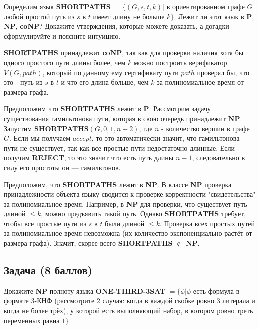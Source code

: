 Определим язык \textbf{SHORTPATHS} $= \{(G, s, t, k) |$ в ориентированном графе $G$ любой простой путь из $s$ в $t$ имеет длину не больше $k\}$. Лежит ли этот язык в \textbf{P}, \textbf{NP}, \textbf{coNP}? Докажите утверждения, которые можете доказать, а догадки - сформулируйте и поясните интуицию.

\begin{solution}
    \textbf{SHORTPATHS} принадлежит \textbf{coNP}, так как для проверки наличия хотя бы одного простого пути длины более, чем $k$ можно построить верификатор $V(G, path)$, который по данному ему сертификату пути $path$ проверял бы, что это - путь из $s$ в $t$ и что его длина больше, чем $k$ за полиномиальное время от размера графа.

    Предположим что \textbf{SHORTPATHS} лежит в \textbf{P}. Рассмотрим задачу существования гамильтонова пути, которая в свою очередь принадлежит \textbf{NP}.
    Запустим \textbf{SHORTPATHS}$(G, 0, 1, n - 2)$, где $n$ - количество вершин в графе $G$. Если мы получаем $accept$, то это автоматически значит, что гамильтонова пути не существует, так как все простые пути недостаточно длинные.
    Если получим \textbf{REJECT}, то это значит что есть путь длины $n - 1$, следовательно в силу его простоты он --- гамильтонов.

    Предположим, что \textbf{SHORTPATHS} лежит в \textbf{NP}. В классе \textbf{NP} проверка принадлежности объекта языку сводится к проверке корректности "свидетельства" за полиномиальное время.
    Например, в \textbf{NP} для проверки, что существует путь длиной $\leq k$, можно предъявить такой путь.
    Однако \textbf{SHORTPATHS} требует, чтобы все простые пути из $s$ в $t$ были длиной $\leq k$.
    Проверка всех простых путей за полиномиальное время невозможна (их количество экспоненциально растёт от размера графа).
    Значит, скорее всего \textbf{SHORTPATHS} $\notin$ \textbf{NP}.
\end{solution}


\subsection{Задача \textbf{(8 баллов)}}

Докажите \textbf{NP}-полноту языка \textbf{ONE-THIRD-3SAT} $ = \{\phi | \phi $ есть формула в формате 3-КНФ (рассмотрите 2 случая: когда в каждой скобке ровно 3 литерала и когда не более трёх), у которой есть выполняющий набор, в котором ровно треть переменных равна $1 \}$

